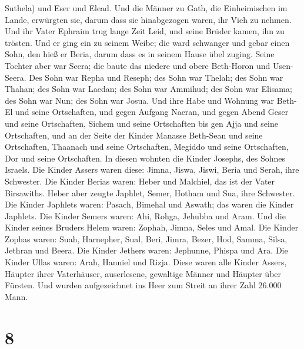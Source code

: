 Suthela) und Eser und Elead. Und die Männer zu Gath, die Einheimischen
im Lande, erwürgten sie, darum dass sie hinabgezogen waren, ihr Vieh zu
nehmen.  Und ihr Vater Ephraim trug lange Zeit Leid, und
seine Brüder kamen, ihn zu trösten.  Und er ging ein zu
seinem Weibe; die ward schwanger und gebar einen Sohn, den hieß er
Beria, darum dass es in seinem Hause übel zuging.  Seine
Tochter aber war Seera; die baute das niedere und obere Beth-Horon und
Usen-Seera.  Des Sohn war Repha und Reseph; des Sohn war
Thelah; des Sohn war Thahan;  des Sohn war Laedan; des
Sohn war Ammihud; des Sohn war Elisama;  des Sohn war
Nun; des Sohn war Josua.  Und ihre Habe und Wohnung war
Beth-El und seine Ortschaften, und gegen Aufgang Naeran, und gegen Abend
Geser und seine Ortschaften, Sichem und seine Ortschaften bis gen Ajja
und seine Ortschaften,  und an der Seite der Kinder
Manasse Beth-Sean und seine Ortschaften, Thaanach und seine Ortschaften,
Megiddo und seine Ortschaften, Dor und seine Ortschaften. In diesen
wohnten die Kinder Josephs, des Sohnes Israels.  Die
Kinder Assers waren diese: Jimna, Jiswa, Jiswi, Beria und Serah, ihre
Schwester.  Die Kinder Berias waren: Heber und Malchiel,
das ist der Vater Birsawiths.  Heber aber zeugte Japhlet,
Semer, Hotham und Sua, ihre Schwester.  Die Kinder
Japhlets waren: Pasach, Bimehal und Aswath; das waren die Kinder
Japhlets.  Die Kinder Semers waren: Ahi, Rohga, Jehubba
und Aram.  Und die Kinder seines Bruders Helem waren:
Zophah, Jimna, Seles und Amal.  Die Kinder Zophas waren:
Suah, Harnepher, Sual, Beri, Jimra,  Bezer, Hod, Samma,
Silsa, Jethran und Beera.  Die Kinder Jethers waren:
Jephunne, Phispa und Ara.  Die Kinder Ullas waren: Arah,
Hanniel und Rizja.  Diese waren alle Kinder Assers,
Häupter ihrer Vaterhäuser, auserlesene, gewaltige Männer und Häupter
über Fürsten. Und wurden aufgezeichnet ins Heer zum Streit an ihrer Zahl
26.000 Mann.

\hypertarget{section-7}{%
\section{8}\label{section-7}}

